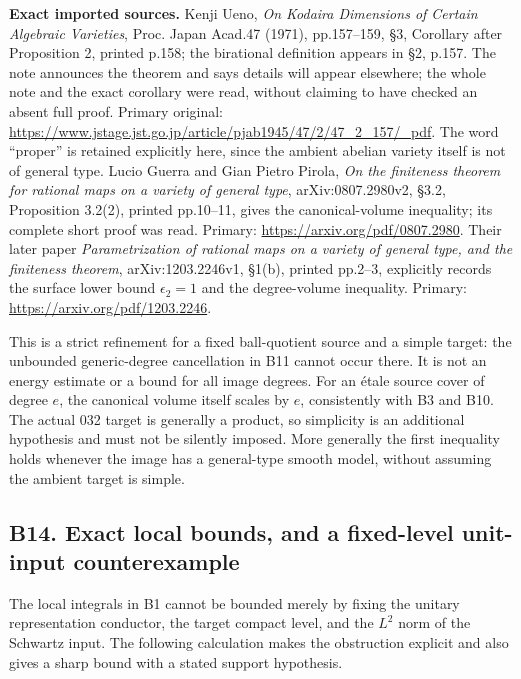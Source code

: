 \textbf{Exact imported sources.} Kenji Ueno, \emph{On Kodaira Dimensions of Certain Algebraic Varieties}, Proc. Japan Acad.47 (1971), pp.157--159, §3, Corollary after Proposition 2, printed p.158; the birational definition appears in §2, p.157. The note announces the theorem and says details will appear elsewhere; the whole note and the exact corollary were read, without claiming to have checked an absent full proof. Primary original: \url{https://www.jstage.jst.go.jp/article/pjab1945/47/2/47_2_157/_pdf}. The word ``proper'' is retained explicitly here, since the ambient abelian variety itself is not of general type. Lucio Guerra and Gian Pietro Pirola, \emph{On the finiteness theorem for rational maps on a variety of general type}, arXiv:0807.2980v2, §3.2, Proposition 3.2(2), printed pp.10--11, gives the canonical-volume inequality; its complete short proof was read. Primary: \url{https://arxiv.org/pdf/0807.2980}. Their later paper \emph{Parametrization of rational maps on a variety of general type, and the finiteness theorem}, arXiv:1203.2246v1, §1(b), printed pp.2--3, explicitly records the surface lower bound \(\epsilon_2=1\) and the degree-volume inequality. Primary: \url{https://arxiv.org/pdf/1203.2246}.

This is a strict refinement for a fixed ball-quotient source and a simple target: the unbounded generic-degree cancellation in B11 cannot occur there. It is not an energy estimate or a bound for all image degrees. For an étale source cover of degree \(e\), the canonical volume itself scales by \(e\), consistently with B3 and B10. The actual 032 target is generally a product, so simplicity is an additional hypothesis and must not be silently imposed. More generally the first inequality holds whenever the image has a general-type smooth model, without assuming the ambient target is simple.

\subsection{B14. Exact local bounds, and a fixed-level unit-input counterexample}\label{b14.-exact-local-bounds-and-a-fixed-level-unit-input-counterexample}

The local integrals in B1 cannot be bounded merely by fixing the unitary representation conductor, the target compact level, and the \(L^2\) norm of the Schwartz input. The following calculation makes the obstruction explicit and also gives a sharp bound with a stated support hypothesis.

